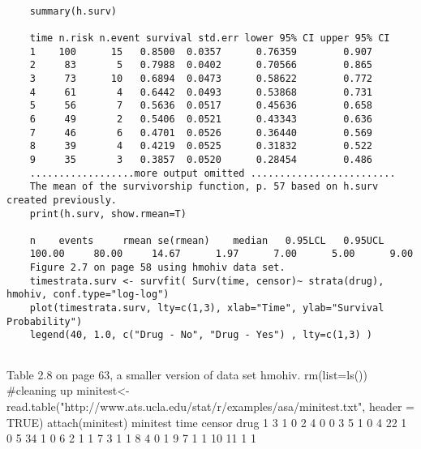 		\begin{framed}
		\begin{verbatim}
	
	summary(h.surv)
	
	time n.risk n.event survival std.err lower 95% CI upper 95% CI
	1    100      15   0.8500  0.0357      0.76359        0.907
	2     83       5   0.7988  0.0402      0.70566        0.865
	3     73      10   0.6894  0.0473      0.58622        0.772
	4     61       4   0.6442  0.0493      0.53868        0.731
	5     56       7   0.5636  0.0517      0.45636        0.658
	6     49       2   0.5406  0.0521      0.43343        0.636
	7     46       6   0.4701  0.0526      0.36440        0.569
	8     39       4   0.4219  0.0525      0.31832        0.522
	9     35       3   0.3857  0.0520      0.28454        0.486
	..................more output omitted .........................
	The mean of the survivorship function, p. 57 based on h.surv created previously.
	print(h.surv, show.rmean=T)
	
	n    events     rmean se(rmean)    median   0.95LCL   0.95UCL 
	100.00     80.00     14.67      1.97      7.00      5.00      9.00 
	Figure 2.7 on page 58 using hmohiv data set.
	timestrata.surv <- survfit( Surv(time, censor)~ strata(drug), hmohiv, conf.type="log-log")
	plot(timestrata.surv, lty=c(1,3), xlab="Time", ylab="Survival Probability")
	legend(40, 1.0, c("Drug - No", "Drug - Yes") , lty=c(1,3) )
	
	\end{verbatim}
\end{framed}
	Table 2.8 on page 63, a smaller version of data set hmohiv.
	rm(list=ls()) #cleaning up 
	minitest<-read.table("http://www.ats.ucla.edu/stat/r/examples/asa/minitest.txt", header = TRUE) 
	attach(minitest)
	minitest
	time censor drug
	1     3      1    0
	2     4      0    0
	3     5      1    0
	4    22      1    0
	5    34      1    0
	6     2      1    1
	7     3      1    1
	8     4      0    1
	9     7      1    1
	10   11      1    1
	
